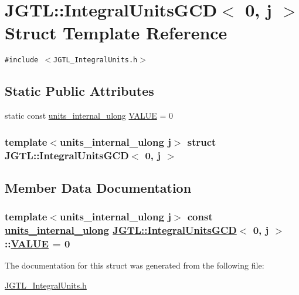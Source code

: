 \hypertarget{struct_j_g_t_l_1_1_integral_units_g_c_d_3_010_00_01j_01_4}{
\section{JGTL::Integral\-Units\-GCD$<$ 0, j $>$ Struct Template Reference}
\label{struct_j_g_t_l_1_1_integral_units_g_c_d_3_010_00_01j_01_4}
}
{\tt \#include $<$JGTL\_\-Integral\-Units.h$>$}

\subsection*{Static Public Attributes}
\begin{CompactItemize}
\item 
static const \hyperlink{namespace_j_g_t_l_1924d6fd42e2d9661bc0b5a5063b99b3}{units\_\-internal\_\-ulong} \hyperlink{struct_j_g_t_l_1_1_integral_units_g_c_d_3_010_00_01j_01_4_5d6ce78c33f337aa3767ae203c04d9e8}{VALUE} = 0
\end{CompactItemize}
\subsubsection*{template$<$units\_\-internal\_\-ulong j$>$ struct JGTL::Integral\-Units\-GCD$<$ 0, j $>$}



\subsection{Member Data Documentation}
\hypertarget{struct_j_g_t_l_1_1_integral_units_g_c_d_3_010_00_01j_01_4_5d6ce78c33f337aa3767ae203c04d9e8}{
\subsubsection[VALUE]{\setlength{\rightskip}{0pt plus 5cm}template$<$units\_\-internal\_\-ulong j$>$ const \hyperlink{namespace_j_g_t_l_1924d6fd42e2d9661bc0b5a5063b99b3}{units\_\-internal\_\-ulong} \hyperlink{struct_j_g_t_l_1_1_integral_units_g_c_d}{JGTL::Integral\-Units\-GCD}$<$ 0, j $>$::\hyperlink{struct_j_g_t_l_1_1_integral_units_g_c_d_3_010_00_01j_01_4_5d6ce78c33f337aa3767ae203c04d9e8}{VALUE} = 0}}
\label{struct_j_g_t_l_1_1_integral_units_g_c_d_3_010_00_01j_01_4_5d6ce78c33f337aa3767ae203c04d9e8}




The documentation for this struct was generated from the following file:\begin{CompactItemize}
\item 
\hyperlink{_j_g_t_l___integral_units_8h}{JGTL\_\-Integral\-Units.h}\end{CompactItemize}
